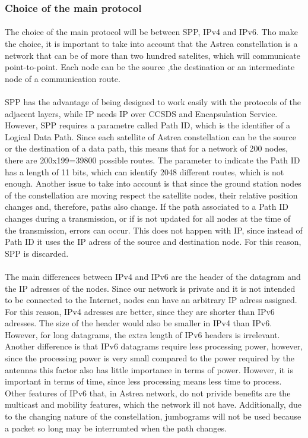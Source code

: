 \subsubsection{Choice of the main protocol}
\paragraph{}The choice of the main protocol will be between SPP, IPv4 and IPv6. Tho make the choice, it is important to take into account that the Astrea constellation is a network that can be of more than two hundred satelites, which will communicate point-to-point. Each node can be the source ,the destination or an intermediate node of a communication route.
\paragraph{}SPP has the advantage of being designed to work easily with the protocols of the adjacent layers, while IP needs IP over CCSDS and Encapsulation Service. However, SPP requires a parametre called Path ID, which is the identifier of a Logical Data Path. Since each satellite of Astrea constellation can be the source or the destination of a data path, this means that for a network of 200 nodes, there are 200x199=39800 possible routes. The parameter to indicate the Path ID has a length of 11 bits, which can identify 2048 different routes, which is not enough. Another issue to take into account is that since the ground station nodes of the constellation are moving respect the satellite nodes, their relative position changes and, therefore, paths also change. If the path associated to a Path ID changes during a transmission, or if is not updated for all nodes at the time of the transmission, errors can occur. This does not happen with IP, since instead of Path ID it uses the IP adress of the source and destination node. For this reason, SPP is discarded.
\paragraph{}The main differences between IPv4 and IPv6 are the header of the datagram and the IP adresses of the nodes. Since our  network is private and it is not intended to be connected to the Internet, nodes can have an arbitrary IP adress assigned. For this reason, IPv4 adresses are better, since they are shorter than IPv6 adresses. The size of the header would also be smaller in IPv4 than IPv6. However, for long datagrams, the extra length of IPv6 headers is irrelevant. Another difference is that IPv6 datagrams require less processing power, however, since the processing power is very small compared to the power required by the antennas this factor also has little importance in terms of power. However, it is important in terms of time, since less processing means less time to process. Other features of IPv6 that, in Astrea network, do not privide benefits are the multicast and mobility features, which the network ill not have. Additionally, due to the changing nature of the constellation, jumbograms will not be used because a packet so long may be interrumted when the path changes.
